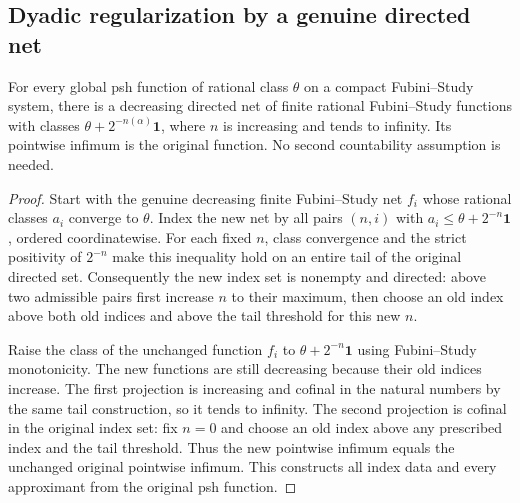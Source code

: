 \subsection{Dyadic regularization by a genuine directed net}

\begin{theorem}
\label{thm:fc-finite-fs-dyadic-net}
\leanok
For every global psh function of rational class $\theta$ on a compact
Fubini--Study system, there is a decreasing directed net of finite rational
Fubini--Study functions with classes $\theta+2^{-n(\alpha)}\mathbf1$, where
$n$ is increasing and tends to infinity. Its pointwise infimum is the original
function. No second countability assumption is needed.
\end{theorem}
\begin{proof}
Start with the genuine decreasing finite Fubini--Study net $f_i$ whose rational
classes $a_i$ converge to $\theta$. Index the new net by all pairs $(n,i)$ with
$a_i\le\theta+2^{-n}\mathbf1$, ordered coordinatewise. For each fixed $n$, class
convergence and the strict positivity of $2^{-n}$ make this inequality hold on
an entire tail of the original directed set. Consequently the new index set
is nonempty and directed: above two admissible pairs first increase $n$ to
their maximum, then choose an old index above both old indices and above the
tail threshold for this new $n$.

Raise the class of the unchanged function $f_i$ to
$\theta+2^{-n}\mathbf1$ using Fubini--Study monotonicity. The new functions are
still decreasing because their old indices increase. The first projection
is increasing and cofinal in the natural numbers by the same tail construction,
so it tends to infinity. The second projection is cofinal in the original
index set: fix $n=0$ and choose an old index above any prescribed index and
the tail threshold. Thus the new pointwise infimum equals the unchanged
original pointwise infimum. This constructs all index data and every
approximant from the original psh function.
\end{proof}
